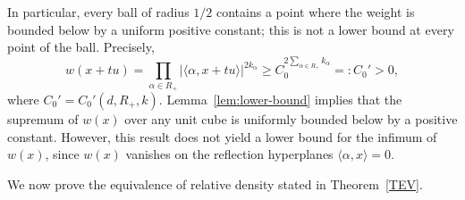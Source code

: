 \documentclass[12pt]{article}
\begin{document}
\begin{remark}
In particular, every ball of radius $1/2$ contains a point where the weight is bounded below by a uniform positive constant; this is not a lower bound at every point of the ball. Precisely,
\[
w(x + tu) = \prod_{\alpha \in R_+} \bigl|\langle \alpha, x + tu \rangle\bigr|^{2k_\alpha} \geq C_0^{2\sum_{\alpha\in R_+} k_\alpha} =: C_0' > 0,
\]
where $C_0'=C_0'(d,R_+,k)$. Lemma~\ref{lem:lower-bound} implies that the supremum of $w(x)$ over any unit cube is uniformly bounded below by a positive constant. However, this result does not yield a lower bound for the infimum of $w(x)$, since $w(x)$ vanishes on the reflection hyperplanes $\langle \alpha, x \rangle = 0$.
\end{remark}

We now prove the equivalence of relative density stated in Theorem~\ref{TEV}.
\end{document}
